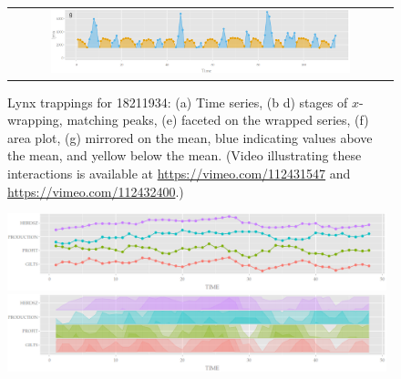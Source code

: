 \documentclass[12pt]{article}
\begin{document}
\begin{itemize}
\begin{figure}[htp]
\begin{center}
\begin{tabular}{cc}
\multicolumn{2}{c}{\includegraphics[width=0.8\textwidth]{graph/pipeline-18-mirrored}} \\
\end{tabular}
\caption{\label{fig:x-wrapping}Lynx trappings for 1821\textendash{}1934:
(a) Time series, (b \textendash{} d) stages of $x$-wrapping, matching
peaks, (e) faceted on the wrapped series, (f) area plot, (g) mirrored
on the mean, blue indicating values above the mean, and yellow below
the mean.  (Video illustrating these interactions is available at
\url{https://vimeo.com/112431547} and \url{https://vimeo.com/112432400}.)}
\end{center}
\end{figure}


\begin{center}
\begin{figure}[htp]
\begin{centering}
\includegraphics[width=0.98\textwidth]{graph/pipeline-17-original-wp-l}
\end{centering}

\begin{centering}
\includegraphics[width=0.98\textwidth]{graph/pipeline-17-ywrap-w}
\end{centering}


\end{figure}
\end{center}
\end{itemize}
\end{document}
